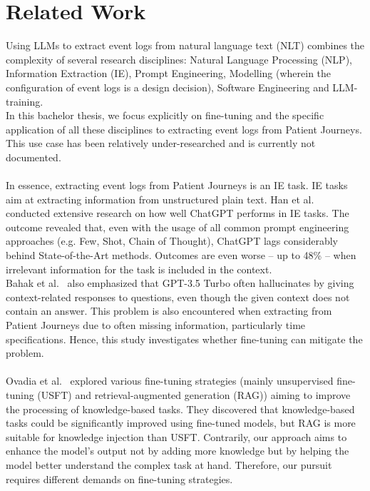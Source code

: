 \section{Related Work}
\label{sec:related_work}
Using LLMs to extract event logs from natural language text (NLT) combines the complexity of several research disciplines: Natural Language Processing (NLP), Information Extraction (IE), Prompt Engineering, Modelling (wherein the configuration of event logs is a design decision), Software Engineering and LLM-training.\\
In this bachelor thesis, we focus explicitly on fine-tuning and the specific application of all these disciplines to extracting event logs from Patient Journeys. This use case has been relatively under-researched and is currently not documented.\\\\
In essence, extracting event logs from Patient Journeys is an IE task. IE tasks aim at extracting information from unstructured plain text. Han et al.~\cite{han_is_2023} conducted extensive research on how well ChatGPT performs in IE tasks. The outcome revealed that, even with the usage of all common prompt engineering approaches (e.g. Few, Shot, Chain of Thought), ChatGPT lags considerably behind State-of-the-Art methods. Outcomes are even worse – up to 48\% – when irrelevant information for the task is included in the context.\\
Bahak et al.~\cite{bahak_evaluating_2023} also emphasized that GPT-3.5 Turbo often hallucinates by giving context-related responses to questions, even though the given context does not contain an answer. This problem is also encountered when extracting from Patient Journeys due to often missing information, particularly time specifications. Hence, this study investigates whether fine-tuning can mitigate the problem.\\\\
Ovadia et al.~\cite{ovadia_fine-tuning_2024} explored various fine-tuning strategies (mainly unsupervised fine-tuning (USFT) and retrieval-augmented generation (RAG)) aiming to improve the processing of knowledge-based tasks. They discovered that knowledge-based tasks could be significantly improved using fine-tuned models, but RAG is more suitable for knowledge injection than USFT. Contrarily, our approach aims to enhance the model's output not by adding more knowledge but by helping the model better understand the complex task at hand. Therefore, our pursuit requires different demands on fine-tuning strategies.\\\\
